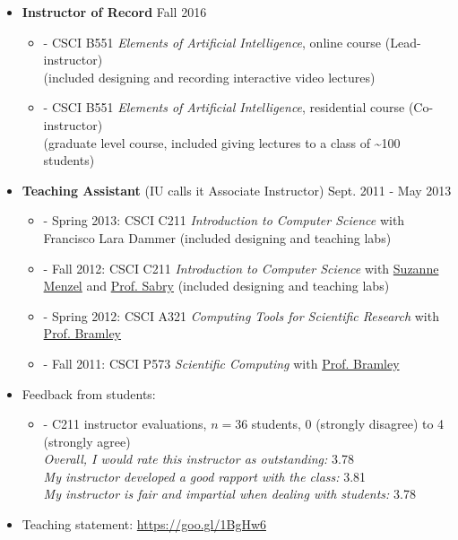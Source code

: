 \documentclass[10pt]{article}
\newenvironment{outerlist}[1][\enskip\textbullet]%
        {\begin{itemize}[#1,leftmargin=*,parsep=5pt,itemsep=0pt,topsep=0pt,partopsep=0pt]}{\end{itemize}%
         \vspace{-.6\baselineskip}}
\newenvironment{innerlist}[1][\enskip\textbullet]%
        {\begin{itemize}[#1,leftmargin=*,parsep=0pt,itemsep=3pt,topsep=-2pt,partopsep=0pt]}
        {\end{itemize}}
\begin{document}
\begin{outerlist}

    \item \textbf{Instructor of Record} \hfill Fall 2016

    \begin{innerlist}
        \item[-] CSCI B551 \emph{Elements of Artificial Intelligence}, online course (Lead-instructor)\\
        (included designing and recording interactive video lectures)
        \item[-] CSCI B551 \emph{Elements of Artificial Intelligence}, residential course (Co-instructor)\\
        (graduate level course, included giving lectures to a class of \textasciitilde 100 students)
    \end{innerlist}

    \item \textbf{Teaching Assistant} (IU calls it Associate Instructor) \hfill Sept. 2011 - May 2013
   
    \begin{innerlist}
        \item[-] Spring 2013: CSCI C211 \emph{Introduction to Computer Science} with Francisco Lara Dammer (included designing and teaching labs)
        \item[-] Fall 2012: CSCI C211 \emph{Introduction to Computer Science} with \href{http://www.cs.indiana.edu/~menzel/}{Suzanne Menzel} and \href{http://www.cs.indiana.edu/~sabry/}{Prof. Sabry} (included designing and teaching labs)
        \item[-] Spring 2012: CSCI A321 \emph{Computing Tools for Scientific Research} with \href{http://www.cs.indiana.edu/~bramley/}{Prof. Bramley}
        \item[-] Fall 2011: CSCI P573 \emph{Scientific Computing} with \href{http://www.cs.indiana.edu/~bramley/}{Prof. Bramley}

    \end{innerlist}

    \item Feedback from students:

    \begin{innerlist}

        \item[-] C211 instructor evaluations, $n=36$ students, 0 (strongly disagree) to 4 (strongly agree)\\
        \emph{Overall, I would rate this instructor as outstanding:} 3.78\\
        \emph{My instructor developed a good rapport with the class:} 3.81\\
        \emph{My instructor is fair and impartial when dealing with students:} 3.78

    \end{innerlist}

    \item Teaching statement: \href{https://goo.gl/1BgHw6}{https://goo.gl/1BgHw6}


\end{outerlist}
\end{document}
